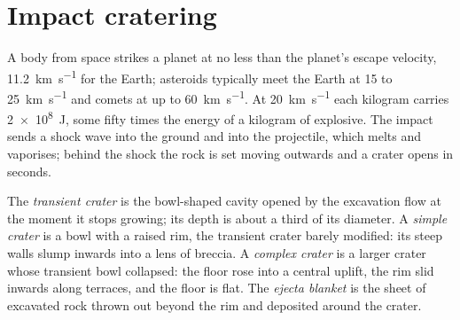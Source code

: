 \section{Impact cratering}\label{sec:b3:planetary-interiors-surfaces:impacts}

A body from space strikes a planet at no less than the planet's escape
velocity, \qty{11.2}{km.s^{-1}} for the Earth; asteroids typically meet
the Earth at 15 to \qty{25}{km.s^{-1}} and comets at up to
\qty{60}{km.s^{-1}}. At \qty{20}{km.s^{-1}} each kilogram carries
\qty{2e8}{J}, some fifty times the energy of a kilogram of explosive. The
impact sends a shock wave into the ground and into the projectile, which
melts and vaporises; behind the shock the rock is set moving outwards and
a crater opens in seconds.

\begin{definition}\label{def:b3:planetary-interiors-surfaces:crater-morphology}
The \emph{transient crater} is the bowl-shaped
cavity opened by the excavation flow at the moment it stops growing; its
depth is about a third of its diameter. A \emph{simple
crater} is a bowl with a raised rim, the transient
crater barely modified: its steep walls slump inwards into a lens of
breccia. A \emph{complex crater} is a larger crater
whose transient bowl collapsed: the floor rose into a central uplift, the
rim slid inwards along terraces, and the floor is flat. The \emph{ejecta
blanket} is the sheet of excavated rock thrown out
beyond the rim and deposited around the crater.
\end{definition}

